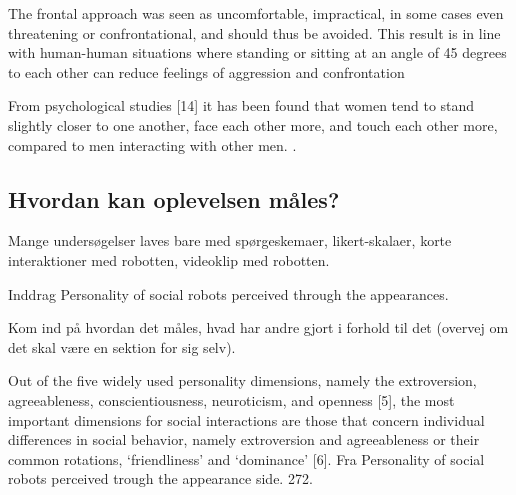 The frontal approach was seen as uncomfortable, impractical, in some cases even threatening or confrontational, and should thus be avoided. This result is in line with human-human situations where standing or sitting at an angle of 45 degrees to each other can reduce feelings of aggression and confrontation \textcite[s. 178]{PDF:HowMayIServeYou}

From psychological studies [14] it has been found that women tend to stand slightly closer to one another, face each other more, and touch each other more, compared to men interacting with other men. \textcite[s. 178]{PDF:HowMayIServeYou}. 

\subsection{Hvordan kan oplevelsen måles?}
\label{InteraktionSocialeRobotterOplevelse}
%
Mange undersøgelser laves bare med spørgeskemaer, likert-skalaer, korte interaktioner med robotten, videoklip med robotten. 

Inddrag Personality of social robots perceived through the appearances.

Kom ind på hvordan det måles, hvad har andre gjort i forhold til det (overvej om det skal være en sektion for sig selv).\blankline


Out of the five widely used personality dimensions, namely the extroversion, agreeableness, conscientiousness, neuroticism, and openness [5], the most important dimensions for social interactions are those that concern individual differences in social behavior, namely extroversion and agreeableness or their common rotations, ‘friendliness’ and ‘dominance’ [6]. Fra Personality of social robots perceived trough the appearance side. 272.










